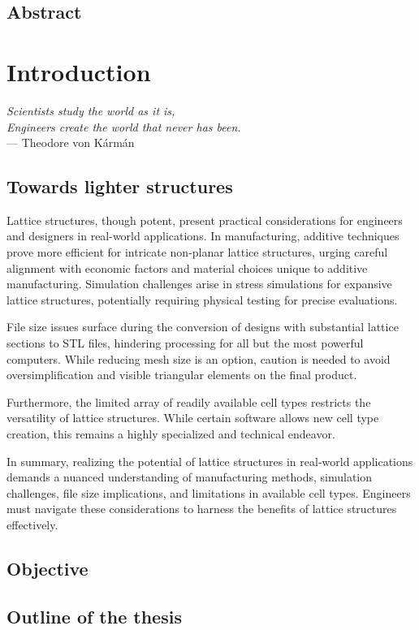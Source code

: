 \section*{Abstract}

\chapter*{Introduction}

\textit{Scientists study the world as it is,}\\
\textit{Engineers create the world that never has been.} \vspace{5pt} \\
--- Theodore von K\'arm\'an \\

\section*{Towards lighter structures}



Lattice structures, though potent, present practical considerations for engineers and designers in real-world applications. In manufacturing, additive techniques prove more efficient for intricate non-planar lattice structures, urging careful alignment with economic factors and material choices unique to additive manufacturing. Simulation challenges arise in stress simulations for expansive lattice structures, potentially requiring physical testing for precise evaluations.

File size issues surface during the conversion of designs with substantial lattice sections to STL files, hindering processing for all but the most powerful computers. While reducing mesh size is an option, caution is needed to avoid oversimplification and visible triangular elements on the final product.

Furthermore, the limited array of readily available cell types restricts the versatility of lattice structures. While certain software allows new cell type creation, this remains a highly specialized and technical endeavor.

In summary, realizing the potential of lattice structures in real-world applications demands a nuanced understanding of manufacturing methods, simulation challenges, file size implications, and limitations in available cell types. Engineers must navigate these considerations to harness the benefits of lattice structures effectively.



\section*{Objective}

\section*{Outline of the thesis}